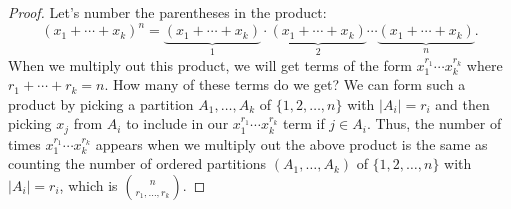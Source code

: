 \documentclass[11pt,dvipsnames]{book}
\numberwithin{figure}{section} %
\numberwithin{table}{section} %
\begin{document}
\begin{proof}

Let's number the parentheses in the product:
\[
(x_{1}+\cdots + x_{k})^{n} = \underbrace{(x_{1}+\cdots + x_{k})}_{1}\cdot \underbrace{(x_{1}+\cdots + x_{k})}_{2}\cdots \underbrace{(x_{1}+\cdots + x_{k})}_{n}.
\]
When we multiply out this product, we will get terms of the form $x_{1}^{r_{1}}\cdots x_{k}^{r_{k}}$ where $r_{1}+\cdots + r_{k}=n$. How many of these terms do we get? We can form such a product by picking a partition $A_{1}, \dots ,A_{k}$ of $\{1,2, \dots ,n\}$ with $|A_i|=r_i$ and then picking $x_j$ from $A_i$ to include in our $x_{1}^{r_{1}}\cdots x_{k}^{r_{k}}$ term if $j\in A_i$. Thus, the number of times $x_{1}^{r_{1}}\cdots x_{k}^{r_{k}}$ appears when we multiply out the above product is the same as counting the number of ordered partitions $(A_{1}, \dots ,A_{k})$ of $\{1,2, \dots ,n\}$ with $|A_i|=r_i$, which is  ${n\choose r_{1}, \dots ,r_{k}} $.

%
\end{proof}
\end{document}
